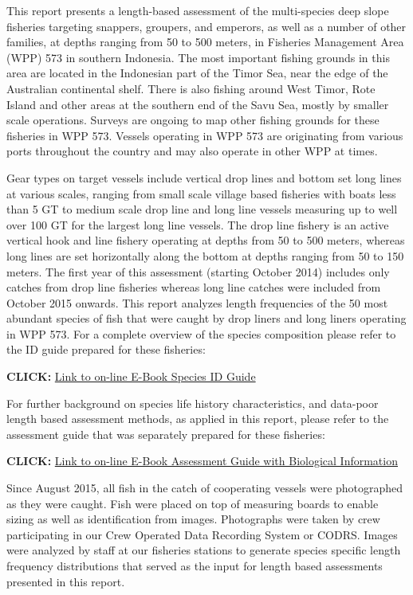 This report presents a length-based assessment of the multi-species deep slope fisheries targeting snappers, groupers, and emperors, as well as a number of other families, at depths ranging from 50 to 500 meters, in Fisheries Management Area (WPP) 573 in southern Indonesia. The most important fishing grounds in this area are located in the Indonesian part of the Timor Sea, near the edge of the Australian continental shelf.  There is also fishing around West Timor, Rote Island and other areas at the southern end of the Savu Sea, mostly by smaller scale operations. Surveys are ongoing to map other fishing grounds for these fisheries in WPP 573. Vessels operating in WPP 573 are originating from various ports throughout the country and may also operate in other WPP at times.

Gear types on target vessels include vertical drop lines and bottom set long lines at various scales, ranging from small scale village based fisheries with boats less than 5 GT to medium scale drop line and long line vessels measuring up to well over 100 GT for the largest long line vessels. The drop line fishery is an active vertical hook and line fishery operating at depths from 50 to 500 meters, whereas long lines are set horizontally along the bottom at depths ranging from 50 to 150 meters. The first year of this assessment (starting October 2014) includes only catches from drop line fisheries whereas long line catches were included from October 2015 onwards. This report analyzes length frequencies of the 50 most abundant species of fish that were caught by drop liners and long liners operating in WPP 573.  For a complete overview of the species composition please refer to the ID guide prepared for these fisheries:

\textbf{CLICK: }\href{http://72.14.187.103:8080/ifish/pub/TNC_FishID.pdf}{Link to on-line E-Book Species ID Guide}

For further background on species life history characteristics, and data-poor length based assessment methods, as applied in this report, please refer to the assessment guide that was separately prepared for these fisheries:

\textbf{CLICK: }\href{http://72.14.187.103:8080/ifish/pub/DeepSlopeSpeciesAssessmentTool.pdf}{Link to on-line E-Book Assessment Guide with Biological Information}

Since August 2015, all fish in the catch of cooperating vessels were photographed as they were caught. Fish were placed on top of measuring boards to enable sizing as well as identification from images. Photographs were taken by crew participating in our Crew Operated Data Recording System or CODRS. Images were analyzed by staff at our fisheries stations to generate species specific length frequency distributions that served as the input for length based assessments presented in this report.

